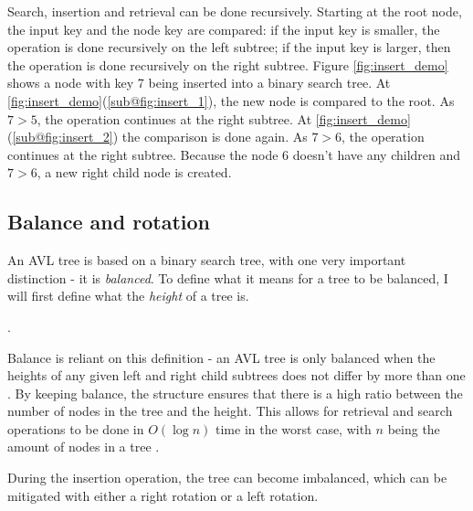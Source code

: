 Search, insertion and retrieval can be done recursively. Starting at the root node, the input key and the node key are compared: if the input key is smaller,
the operation is done recursively on the left subtree; if the input key is larger, then the operation is done recursively on the right subtree. Figure \ref{fig:insert_demo} shows 
a node with key 7 being inserted into a binary search tree. At \ref{fig:insert_demo}(\ref{sub@fig:insert_1}), the new node is compared to the root. As $7 > 5$, the operation continues at 
the right subtree. At \ref{fig:insert_demo}(\ref{sub@fig:insert_2}) the comparison is done again. As $7 > 6$, the operation continues at the right subtree. Because the node 6 doesn't have any children and $7 > 6$,
a new right child node is created.

\subsection{Balance and rotation}
An AVL tree is based on a binary search tree, with one very important distinction - it is \textit{balanced}. To define what it means for a tree to be balanced, I will first
define what the \textit{height} of a tree is.

\begin{definition}
  \label{def:height}
  .
\end{definition} 
 
Balance is reliant on this definition - an AVL tree is only balanced when the 
heights of any given left and right child subtrees does not differ by more than one \cite{avl:original}. By keeping balance, the structure ensures that there is a high ratio between the number of 
nodes in the tree and the height. This allows for retrieval and search operations to be done in $O(\log n)$ time in the worst case, with $n$ being the amount of nodes in a tree \cite{avl:computer}.

During the insertion operation, the tree can become imbalanced, which can be mitigated
with either a right rotation or a left rotation. 